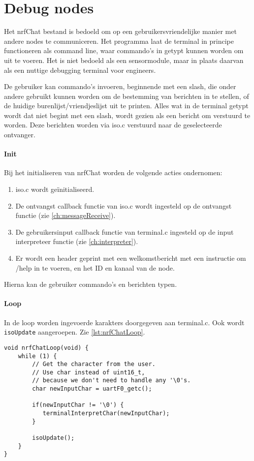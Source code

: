 \section{Debug nodes}
Het nrfChat bestand is bedoeld om op een gebruikersvriendelijke manier met andere nodes te communiceren. Het programma laat de terminal in principe functioneren als command line, waar commando's in getypt kunnen worden om uit te voeren. Het is niet bedoeld als een sensormodule, maar in plaats daarvan als een nuttige debugging terminal voor engineers.

De gebruiker kan commando's invoeren, beginnende met een slash, die onder andere gebruikt kunnen worden om de bestemming van berichten in te stellen, of de huidige burenlijst/vriendjeslijst uit te printen. Alles wat in de terminal getypt wordt dat niet begint met een slash, wordt gezien als een bericht om verstuurd te worden. Deze berichten worden via iso.c verstuurd naar de geselecteerde ontvanger.

\paragraph*{Init}
Bij het initialiseren van nrfChat worden de volgende acties ondernomen:
\begin{enumerate}
    \item iso.c wordt geïnitialiseerd. 
    \item De ontvangst callback functie van iso.c wordt ingesteld op de ontvangst functie (zie \autoref{ch:messageReceive}).
    \item De gebruikersinput callback functie van terminal.c ingesteld op de input interpreteer functie (zie \autoref{ch:interpreter}).
    \item Er wordt een header geprint met een welkomstbericht met een instructie om /help in te voeren, en het ID en kanaal van de node.
\end{enumerate}

Hierna kan de gebruiker commando's en berichten typen.

\paragraph*{Loop}
In de loop worden ingevoerde karakters doorgegeven aan terminal.c. Ook wordt \texttt{isoUpdate} aangeroepen. Zie \autoref{lst:nrfChatLoop}.

\begin{lstlisting}[caption={De nrfChat loop},captionpos=b,label={lst:nrfChatLoop},style=c,xleftmargin=.\textwidth,xrightmargin=.\textwidth]
void nrfChatLoop(void) {
    while (1) {
        // Get the character from the user.
        // Use char instead of uint16_t,
        // because we don't need to handle any '\0's.
        char newInputChar = uartF0_getc();

        if(newInputChar != '\0') {
           terminalInterpretChar(newInputChar);
        }

        isoUpdate();
    }
}
\end{lstlisting}


